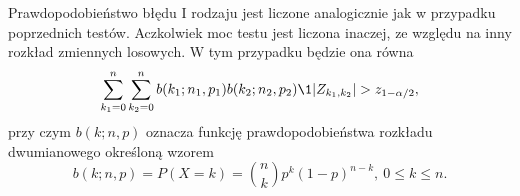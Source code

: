 Prawdopodobieństwo błędu I rodzaju jest liczone analogicznie jak w przypadku poprzednich testów. Aczkolwiek moc testu jest liczona inaczej, ze względu na inny rozkład zmiennych losowych. W tym przypadku będzie ona równa
\begin{equation}
\sum_{k_1=0}^{n}\sum_{k_2=0}^{n} b(k_1;n_1,p_1)b(k_2;n_2,p_2)\1{|Z_{k_1,k_2}|>z_{1-\alpha/2}},
\end{equation}
przy czym $b(k;n,p)$ oznacza funkcję prawdopodobieństwa rozkładu dwumianowego określoną wzorem
\begin{equation}
b(k;n,p) = P(X=k) = \binom{n}{k} p^k (1-p)^{n-k},\ 0\leq k\leq n.
\end{equation}
